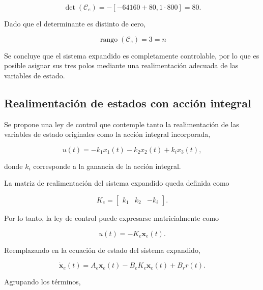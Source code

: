 \documentclass[10pt]{article}
\begin{document}
\begin{equation}
    \det(\mathcal{C}_e)=
    -\left[-64160+80{,}1\cdot800\right]=80.
\end{equation}

Dado que el determinante es distinto de cero,

\begin{equation}
    \boxed{
        \operatorname{rango}(\mathcal{C}_e)=3=n
    }
\end{equation}

Se concluye que el sistema expandido es completamente
controlable, por lo que es posible asignar sus tres
polos mediante una realimentación adecuada de las
variables de estado.


\subsection{Realimentación de estados con acción integral}

Se propone una ley de control que contemple tanto
la realimentación de las variables de estado originales
como la acción integral incorporada,

\begin{equation}
    u(t)=
    -k_1x_1(t)-k_2x_2(t)+k_ix_3(t),
\end{equation}

donde $k_i$ corresponde a la ganancia de la acción
integral.

La matriz de realimentación del sistema expandido
queda definida como

\begin{equation}
    K_e=
    \begin{bmatrix}
        k_1 & k_2 & -k_i
    \end{bmatrix}.
\end{equation}

Por lo tanto, la ley de control puede expresarse
matricialmente como

\begin{equation}
    u(t)=-K_e\mathbf{x}_e(t).
\end{equation}

Reemplazando en la ecuación de estado del sistema
expandido,

\begin{equation}
    \dot{\mathbf{x}}_e(t)=
    A_e\mathbf{x}_e(t)
    -B_eK_e\mathbf{x}_e(t)+B_rr(t).
\end{equation}

Agrupando los términos,
\end{document}
